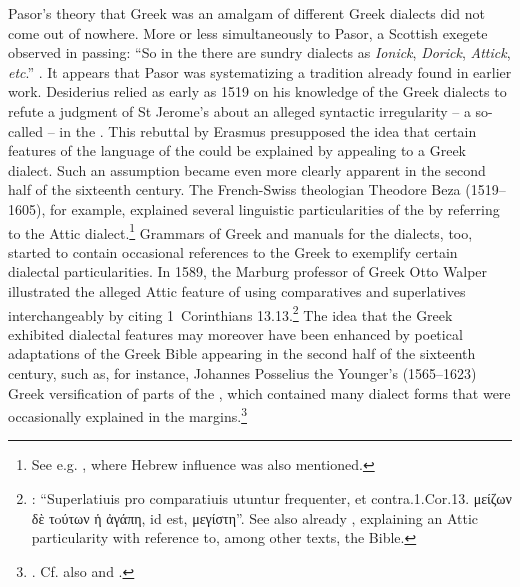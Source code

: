 Pasor’s theory that  Greek was an amalgam of different Greek dialects did not come out of nowhere. More or less simultaneously to Pasor, a Scottish exegete observed in passing: “So in the  there are sundry dialects as \textit{Ionick}, \textit{Dorick}, \textit{Attick}, \textit{etc}.” \citep[102]{Weemes1632}. It appears that Pasor was systematizing a tradition already found in earlier work. Desiderius \citet[270]{Erasmus1519} relied as early as 1519 on his knowledge of the Greek dialects to refute a judgment of St Jerome’s about an alleged syntactic irregularity – a so-called  – in the . This rebuttal by Erasmus presupposed the idea that certain features of the language of the  could be explained by appealing to a Greek dialect. Such an assumption became even more clearly apparent in the second half of the sixteenth century. The French-Swiss  theologian Theodore Beza (1519–1605), for example, explained several linguistic particularities of the  by referring to the Attic dialect.\footnote{See e.g. \citet[\textsc{i.}226, \textsc{ii}.355]{Beza1594}, where Hebrew influence was also mentioned.} Grammars of Greek and manuals for the dialects, too, started to contain occasional references to the Greek  to exemplify certain dialectal particularities. In 1589, the Marburg professor of Greek Otto Walper illustrated the alleged Attic feature of using comparatives and superlatives interchangeably by citing 1~Corinthians 13.13.\footnote{\citet[32]{Walper1589}: “Superlatiuis pro comparatiuis utuntur frequenter, et contra.1.Cor.13. μείζων δὲ τoύτων ἡ ἀγάπη, id est, μεγίστη”. See also already \citet[251]{Ruland1556}, explaining an Attic particularity with reference to, among other texts, the Bible.} The idea that the Greek  exhibited dialectal features may moreover have been enhanced by poetical adaptations of the Greek Bible appearing in the second half of the sixteenth century, such as, for instance, Johannes Posselius the Younger’s (1565–1623) Greek versification of parts of the , which contained many dialect forms that were occasionally explained in the margins.\footnote{\citet{Posselius1599}. Cf. also \citet{Jamot1593} and \citet{Keimann1649}.}

